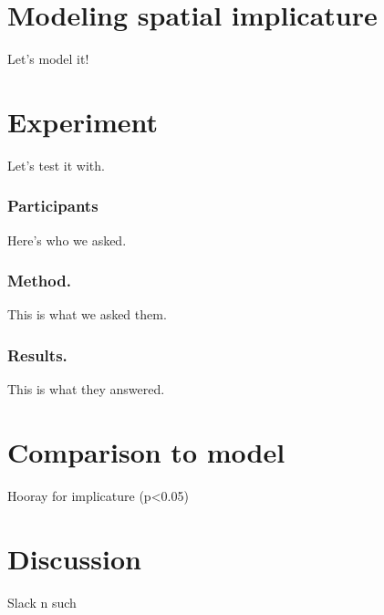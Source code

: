 \documentclass[10pt,letterpaper]{article}
\begin{document}
\section{Modeling spatial implicature}\label{mod}

Let's model it!

\section{Experiment}\label{sec:exps}

Let's test it with. 

\subsubsection{Participants} Here's who we asked. 

\subsubsection{Method.} This is what we asked them. 

\subsubsection{Results.} This is what they answered. 

\section{Comparison to model}

Hooray for implicature (p<0.05)

\section{Discussion}

Slack n such


\setlength{\bibleftmargin}{.125in}
\setlength{\bibindent}{-\bibleftmargin}

\end{document}
